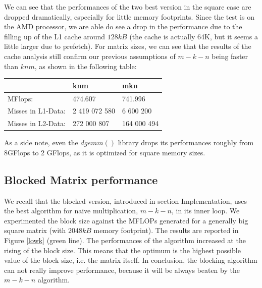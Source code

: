 We can see that the performances of the two best version in the square case are dropped dramatically, especially for little memory footprints. Since the test is on the AMD processor, we are able do see a drop in the performance due to the filling up of the L1 cache around $128kB$ (the cache is actually 64K, but it seems a little larger due to prefetch). For matrix sizes, we can see that the results of the cache analysis still confirm our previous assumptions of $m-k-n$ being faster than $knm$, as shown in the following table:


\vspace{10pt} 
\begin{tabular}{ l l l}
\hline
 & knm& mkn\\ \hline
MFlops:        &  474.607& 741.996 \\ \hline
Misses in L1-Data:     & 2 419 072 580 & 6 600 200 \\ \hline
Misses in L2-Data:     & 272 000 807 & 164 000 494\\ \hline

\end{tabular}

\vspace{10pt} 

As a side note, even the $dgemm()$ library drops its performances roughly from 8GFlops to 2 GFlops, as it is optimized for square memory sizes.

\clearpage
\subsection{Blocked Matrix performance}
We recall that the blocked version, introduced in section Implementation, uses the best algorithm for naive multiplication, $m-k-n$, in its inner loop. We experimented the block size against the MFLOPs generated for a generally big square matrix (with $2048kB$ memory footprint). The results are reported in Figure \ref{lowk} (green line). The performances of the algorithm increased at the rising of the block size. This means that the optimum is the highest possible value of the block size, i.e. the matrix itself. In conclusion, the blocking algorithm can not really improve performance, because it will be always beaten by the $m-k-n$ algorithm. 


